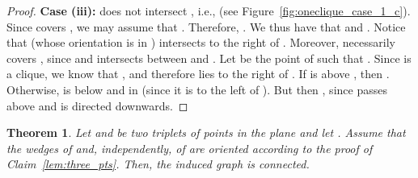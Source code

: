 \documentclass[11pt]{article}
\newtheorem{theorem}{Theorem}[section]
\begin{document}
\begin{proof}
{\bf Case (iii):}  does not intersect , i.e.,  (see Figure~\ref{fig:oneclique_case_1_c}). Since  covers , we may assume that . Therefore, . We thus have that  and . Notice that  (whose orientation is in )
intersects  to the right of . Moreover,  necessarily covers , since  and  intersects  between  and . Let  be the point of  such that .
Since  is a clique, we know that , and therefore  lies to the right of . If  is above , then . Otherwise,  is below  and in  (since it is to the left of ). But then , since  passes above  and  is directed downwards.
\end{proof}

\begin{theorem}\label{thm:no_cliques}
Let  and  be two triplets of points in the plane and let .
Assume that the wedges of  and, independently, of  are oriented according to the proof of 
Claim~\ref{lem:three_pts}.
Then, the induced graph  is connected.
\end{theorem}
\end{document}
